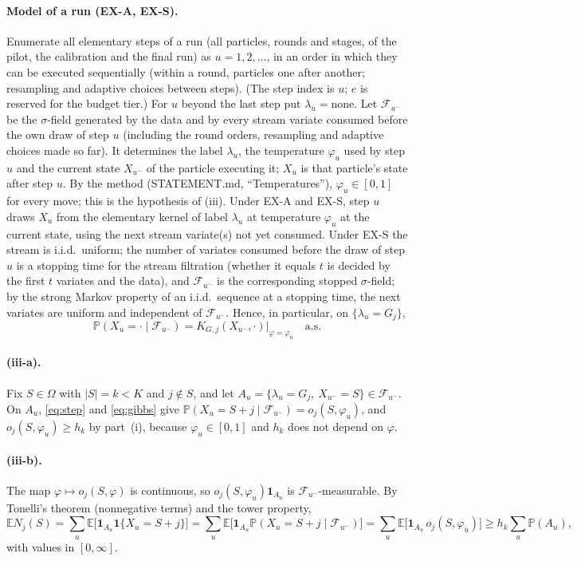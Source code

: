 \documentclass[11pt]{article}
\theoremstyle{definition}
\newcommand{\Om}{\Omega}
\renewcommand{\Pr}{\mathbb P}
\newcommand{\E}{\mathbb E}
\newcommand{\cF}{\mathcal F}
\newcommand{\ph}{\varphi}
\newcommand{\one}{\mathbf 1}
\begin{document}
\paragraph{Model of a run (EX-A, EX-S).} Enumerate all elementary steps of a run (all particles, rounds and stages, of the pilot, the calibration and the final run) as $u=1,2,\dots$, in an order in which they can be executed sequentially (within a round, particles one after another; resampling and adaptive choices between steps). (The step index is $u$; $e$ is reserved for the budget tier.) For $u$ beyond the last step put $\lambda_u=\text{none}$. Let $\cF_{u^-}$ be the $\sigma$-field generated by the data and by every stream variate consumed before the own draw of step $u$ (including the round orders, resampling and adaptive choices made so far). It determines the label $\lambda_u$, the temperature $\ph_u$ used by step $u$ and the current state $X_{u^-}$ of the particle executing it; $X_u$ is that particle's state after step $u$. By the method (STATEMENT.md, ``Temperatures''), $\ph_u\in[0,1]$ for every move; this is the hypothesis of (iii). Under EX-A and EX-S, step $u$ draws $X_u$ from the elementary kernel of label $\lambda_u$ at temperature $\ph_u$ at the current state, using the next stream variate(s) not yet consumed. Under EX-S the stream is i.i.d.\ uniform; the number of variates consumed before the draw of step $u$ is a stopping time for the stream filtration (whether it equals $t$ is decided by the first $t$ variates and the data), and $\cF_{u^-}$ is the corresponding stopped $\sigma$-field; by the strong Markov property of an i.i.d.\ sequence at a stopping time, the next variates are uniform and independent of $\cF_{u^-}$. Hence, in particular, on $\{\lambda_u=G_j\}$,
\begin{equation}\label{eq:step}
\Pr(X_u=\cdot\mid\cF_{u^-})=K_{G,j}(X_{u^-},\cdot)\big|_{\ph=\ph_u}\quad\text{a.s.}
\end{equation}

\paragraph{(iii-a).} Fix $S\in\Om$ with $|S|=k<K$ and $j\notin S$, and let $A_u=\{\lambda_u=G_j,\ X_{u^-}=S\}\in\cF_{u^-}$. On $A_u$, \eqref{eq:step} and \eqref{eq:gibbs} give $\Pr(X_u=S+j\mid\cF_{u^-})=o_j(S,\ph_u)$, and $o_j(S,\ph_u)\ge h_k$ by part~(i), because $\ph_u\in[0,1]$ and $h_k$ does not depend on $\ph$.

\paragraph{(iii-b).} The map $\ph\mapsto o_j(S,\ph)$ is continuous, so $o_j(S,\ph_u)\one_{A_u}$ is $\cF_{u^-}$-measurable. By Tonelli's theorem (nonnegative terms) and the tower property,
\[
\E N_j(S)=\sum_u\E\big[\one_{A_u}\one\{X_u=S+j\}\big]=\sum_u\E\big[\one_{A_u}\Pr(X_u=S+j\mid\cF_{u^-})\big]=\sum_u\E\big[\one_{A_u}\,o_j(S,\ph_u)\big]\ge h_k\sum_u\Pr(A_u),
\]
with values in $[0,\infty]$.
\end{document}
